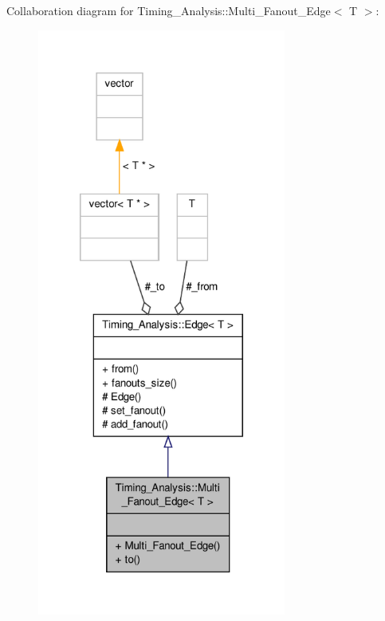 Collaboration diagram for Timing\-\_\-\-Analysis\-:\-:Multi\-\_\-\-Fanout\-\_\-\-Edge$<$ T $>$\-:\nopagebreak
\begin{figure}[H]
\begin{center}
\leavevmode
\includegraphics[height=550pt]{classTiming__Analysis_1_1Multi__Fanout__Edge__coll__graph}
\end{center}
\end{figure}

